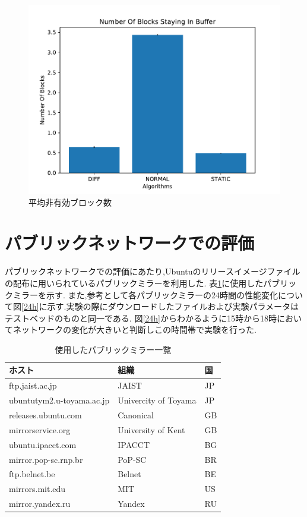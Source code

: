 \documentclass[a4j,12pt]{gradthesis_utf8}
\begin{document}
\begin{figure}[ht]
	\begin{center}
		\includegraphics[width=12.125cm]{figure/NumberOfBlocksStayingInBuffer.pdf}
		\caption{平均非有効ブロック数}
		\label{nsb}
	\end{center}
\end{figure}



\newpage

\section{パブリックネットワークでの評価}
\label{pub}
パブリックネットワークでの評価にあたり,Ubuntuのリリースイメージファイルの配布に用いられているパブリックミラーを利用した.
表\ref{tablemirror}に使用したパブリックミラーを示す.
また,参考として各パブリックミラーの24時間の性能変化について図\ref{24h}に示す.実験の際にダウンロードしたファイルおよび実験パラメータはテストベッドのものと同一である.
図\ref{24h}からわかるように15時から18時においてネットワークの変化が大きいと判断しこの時間帯で実験を行った.
\begin{table}[htb]
	\begin{center}
		\caption{使用したパブリックミラー一覧}
		\label{tablemirror}
		\begin{tabular}{|l|l|l|} \hline
			ホスト & 組織 & 国\\ \hline \hline
			ftp.jaist.ac.jp & JAIST & JP \\
			ubuntutym2.u-toyama.ac.jp & Univercity of Toyama & JP \\
			releases.ubuntu.com & Canonical & GB \\
			mirrorservice.org & University of Kent & GB \\
			ubuntu.ipacct.com & IPACCT & BG \\
			mirror.pop-sc.rnp.br & PoP-SC & BR \\
			ftp.belnet.be & Belnet & BE \\
			mirrors.mit.edu & MIT & US \\
			mirror.yandex.ru & Yandex & RU \\ \hline
		\end{tabular}
	\end{center}
\end{table}
\end{document}
